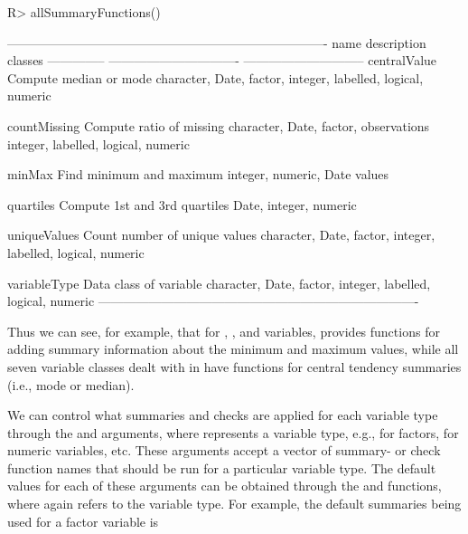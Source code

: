 \documentclass[article,shortnames]{jss}
\begin{document}
\begin{Schunk}
\begin{Sinput}
R> allSummaryFunctions()
\end{Sinput}
\begin{Soutput}
----------------------------------------------------------------------------
name           description                     classes                      
-------------- ------------------------------- -----------------------------
centralValue   Compute median or mode          character, Date, factor,     
                                               integer, labelled, logical,  
                                               numeric                      

countMissing   Compute ratio of missing        character, Date, factor,     
               observations                    integer, labelled, logical,  
                                               numeric                      

minMax         Find minimum and maximum        integer, numeric, Date       
               values                                                       

quartiles      Compute 1st and 3rd quartiles   Date, integer, numeric       

uniqueValues   Count number of unique values   character, Date, factor,     
                                               integer, labelled, logical,  
                                               numeric                      

variableType   Data class of variable          character, Date, factor,     
                                               integer, labelled, logical,  
                                               numeric                      
----------------------------------------------------------------------------
\end{Soutput}
\end{Schunk}

Thus we can see, for example, that for , ,
and  variables,  provides functions for
adding summary information about the minimum and maximum values, while
all seven variable classes dealt with in  have functions
for central tendency summaries (i.e., mode or median).

We can control what summaries and checks are applied for each variable type
through the  and  arguments, where 
represents a variable type, e.g.,  for factors,
 for numeric variables, etc. These arguments accept a
vector of summary- or check function names that should be run for a
particular variable type. The default values for each of these
arguments can be obtained through the 
and  functions, where  again refers to
the variable type. For example, the default summaries being used for a factor variable is
\end{document}
